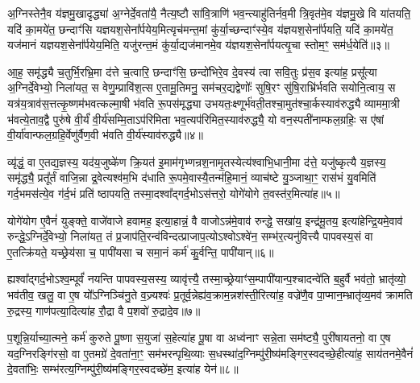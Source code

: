 अ॒ग्निस्तेनै॒व य॑ज्ञमु॒खादृद्ध्या॑ अ॒ग्नेर्दे॒वता॑यै॒ नैत्य॒ष्टौ सा॑वि॒त्राणि॑ भव॒न्त्याहु॑तिर्नव॒मी त्रि॒वृत॑मे॒व य॑ज्ञमु॒खे वि या॑तयति॒ यदि॑ का॒मये॑त॒ छन्दाꣳ॑सि यज्ञयश॒सेना᳚र्पयेय॒मित्यृच॑मन्त॒मां कु॑र्या॒च्छन्दाꣳ॑स्ये॒व य॑ज्ञयश॒सेना᳚र्पयति॒ यदि॑ का॒मये॑त॒ यज॑मानं यज्ञयश॒सेना᳚र्पयेय॒मिति॒ यजु॑रन्त॒मं कु॑र्या॒द्यज॑मानमे॒व य॑ज्ञयश॒सेना᳚र्पयत्यृ॒चा स्तोम॒ꣳ॒ सम॑र्ध॒येति॑॥३॥

आ॒ह॒ समृ॑द्ध्यै च॒तुर्भि॒रभ्रि॒मा द॑त्ते च॒त्वारि॒ छन्दाꣳ॑सि॒ छन्दो॑भिरे॒व दे॒वस्य॑ त्वा सवि॒तुः प्र॑स॒व इत्या॑ह॒ प्रसू᳚त्या अ॒ग्निर्दे॒वेभ्यो॒ निला॑यत॒ स वेणु॒म्प्रावि॑श॒त्स ए॒तामू॒तिमनु॒ सम॑चर॒द्यद्वेणोः᳚ सुषि॒रꣳ सु॑षि॒राभ्रि॑र्भवति सयोनि॒त्वाय॒ स यत्र॑य॒त्राव॑स॒त्तत्कृ॒ष्णम॑भवत्कल्मा॒षी भ॑वति रू॒पस॑मृद्ध्या उभयतः॒क्ष्णूर्भ॑वती॒तश्चा॒मुत॑श्चा॒र्कस्याव॑रुद्ध्यै व्याममा॒त्री भ॑वत्ये॒ताव॒द्वै पुरु॑षे वी॒र्यं॑ वी॒र्य॑सम्मि॒ता\-ऽप॑रिमिता भव॒त्यप॑रिमित॒स्याव॑रुद्ध्यै॒ यो वन॒स्पती॑नाम्फल॒ग्रहिः॒ स ए॑षां वी॒र्या॑वान्फल॒ग्रहि॒र्वेणु॑र्वैण॒वी भ॑वति वी॒र्य॑स्याव॑रुद्ध्यै॥४॥

{\anuvakamend[{का॒मये॑त गाय॒त्रो᳚\-ऽर्ध॒येति॑ च स॒प्तविꣳ॑शतिश्च॥१॥}]}

व्यृ॑द्धं॒ वा ए॒तद्य॒ज्ञस्य॒ यद॑य॒जुष्के॑ण क्रि॒यत॑ इ॒माम॑गृभ्णन्रश॒नामृ॒तस्येत्य॑श्वाभि॒धानी॒मा द॑त्ते॒ यजु॑ष्कृत्यै य॒ज्ञस्य॒ समृ॑द्ध्यै॒ प्रतू᳚र्तं वाजि॒न्ना द्र॒वेत्यश्व॑म॒भि द॑धाति रू॒पमे॒वास्यै॒तन्म॑हि॒मानं॒ व्याच॑ष्टे यु॒ञ्जाथा॒ꣳ॒ रास॑भं यु॒वमिति॑ गर्द॒भमस॑त्ये॒व ग॑र्द॒भं प्रति॑ ष्ठापयति॒ तस्मा॒दश्वा᳚द्गर्द॒भो\-ऽस॑त्तरो॒ योगे॑योगे त॒वस्त॑र॒मित्या॑ह॥५॥

योगे॑योग ए॒वैनं॑ युङ्क्ते॒ वाजे॑वाजे हवामह॒ इत्या॒हान्नं॒ वै वाजो\-ऽन्न॑मे॒वाव॑ रुन्द्धे॒ सखा॑य॒ इन्द्र॑मू॒तय॒ इत्या॑हेन्द्रि॒यमे॒वाव॑ रुन्द्धे॒\-ऽग्निर्दे॒वेभ्यो॒ निला॑यत॒ तं प्र॒जाप॑ति॒रन्व॑विन्दत्प्राजाप॒त्यो\-ऽश्वो\-ऽश्वे॑न॒ सम्भ॑र॒त्यनु॑वित्त्यै पापवस्य॒सं वा ए॒तत्क्रि॑यते॒ यच्छ्रेय॑सा च॒ पापी॑यसा च समा॒नं कर्म॑ कु॒र्वन्ति॒ पापी॑यान्॥६॥

ह्यश्वा᳚द्गर्द॒भो\-ऽश्व॒म्पूर्वं॑ नयन्ति पापवस्य॒सस्य॒ व्यावृ॑त्त्यै॒ तस्मा॒च्छ्रेयाꣳ॑स॒म्पापी॑यान्प॒श्चादन्वे॑ति ब॒हुर्वै भव॑तो॒ भ्रातृ॑व्यो॒ भव॑तीव॒ खलु॒ वा ए॒ष यो᳚\-ऽग्निञ्चि॑नु॒ते व॒ज्र्यश्वः॑ प्र॒तूर्व॒न्नेह्य॑व॒क्राम॒न्नश॑स्ती॒रित्या॑ह॒ वज्रे॑णै॒व पा॒प्मान॒म्भ्रातृ॑व्य॒मव॑ क्रामति रु॒द्रस्य॒ गाण॑पत्या॒दित्या॑ह रौ॒द्रा वै प॒शवो॑ रु॒द्रादे॒व॥७॥

प॒शून्नि॒र्याच्या॒त्मने॒ कर्म॑ कुरुते पू॒ष्णा स॒युजा॑ स॒हेत्या॑ह पू॒षा वा अध्व॑नाꣳ सन्ने॒ता सम॑ष्ट्यै॒ पुरी॑षायतनो॒ वा ए॒ष यद॒ग्निरङ्गि॑रसो॒ वा ए॒तमग्रे॑ दे॒वता॑ना॒ꣳ॒ सम॑भरन्पृथि॒व्याः स॒धस्था॑द॒ग्निम्पु॑री॒ष्य॑मङ्गिर॒स्वदच्छे॒हीत्या॑ह॒ साय॑तनमे॒वैनं॑ दे॒वता॑भिः॒ सम्भ॑रत्य॒ग्निम्पु॑री॒ष्य॑मङ्गिर॒स्वदच्छे॑म॒ इत्या॑ह येन॑॥८॥

